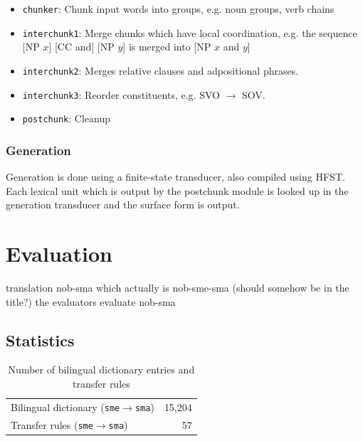 \documentclass[a4paper,11pt,twocolumn]{article}
\begin{document}


\begin{itemize} 
  \item \texttt{chunker}: Chunk input words into groups, e.g. noun groups, verb chains
  \item \texttt{interchunk1}: Merge chunks which have local coordination, e.g. the sequence [NP $x$] [CC and] [NP $y$] is merged into [NP $x$ and $y$]
  \item \texttt{interchunk2}: Merges relative clauses and adpositional phrases.
  \item \texttt{interchunk3}: Reorder constituents, e.g. SVO $\rightarrow$ SOV.
  \item \texttt{postchunk}: Cleanup
\end{itemize}


\subsubsection{Generation}

Generation is done using a finite-state transducer, also 
compiled using HFST. Each lexical unit which is output by
the postchunk module is looked up in the generation transducer
and the surface form is output.

\section{Evaluation}
 translation nob-sma which actually is nob-sme-sma (should somehow be in the title?) 
 the evaluators evaluate nob-sma

\subsection{Statistics}
\begin{table}
  \begin{center}
    \begin{tabular}{|l|r|}
      \hline
      Bilingual dictionary ({\tt sme}$\rightarrow${\tt sma}) & 15,204 \\ %
      Transfer rules ({\tt sme}$\rightarrow${\tt sma}) & 57 \\
      \hline
    \end{tabular}
    \label{table:transfer}
    \caption{Number of bilingual dictionary entries and transfer rules}
  \end{center}
\end{table}
\end{document}
